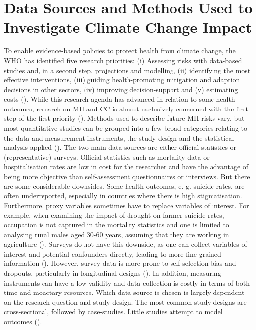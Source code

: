 \documentclass[
]{krantz}
\begin{document}
\section{Data Sources and Methods Used to Investigate Climate Change Impact}\label{data-sources-and-methods-used-to-investigate-climate-change-impact}

To enable evidence-based policies to protect health from climate change, the WHO has identified five research priorities: (i) Assessing risks with data-based studies and, in a second step, projections and modelling, (ii) identifying the most effective interventions, (iii) guiding health-promoting mitigation and adaption decisions in other sectors, (iv) improving decision-support and (v) estimating costs (\citet{worldhealthorganization2009}).
While this research agenda has advanced in relation to some health outcomes, research on MH and CC is almost exclusively concerned with the first step of the first priority (\citet{cianconi2020}). Methods used to describe future MH risks vary, but most quantitative studies can be grouped into a few broad categories relating to the data and measurement instruments, the study design and the statistical analysis applied (\citet{charlson2021}). The two main data sources are either official statistics or (representative) surveys. Official statistics such as mortality data or hospitalisation rates are low in cost for the researcher and have the advantage of being more objective than self-assessment questionnaires or interviews. But there are some considerable downsides. Some health outcomes, e. g. suicide rates, are often underreported, especially in countries where there is high stigmatisation. Furthermore, proxy variables sometimes have to replace variables of interest. For example, when examining the impact of drought on farmer suicide rates, occupation is not captured in the mortality statistics and one is limited to analysing rural males aged 30-60 years, assuming that they are working in agriculture (\citet{carleton2017}). Surveys do not have this downside, as one can collect variables of interest and potential confounders directly, leading to more fine-grained information (\citet{edwards2015}). However, survey data is more prone to self-selection bias and dropouts, particularly in longitudinal designs (\citet{kessler2008}). In addition, measuring instruments can have a low validity and data collection is costly in terms of both time and monetary resources. Which data source is chosen is largely dependent on the research question and study design.
The most common study designs are cross-sectional, followed by case-studies. Little studies attempt to model outcomes (\citet{charlson2021}).
\end{document}
